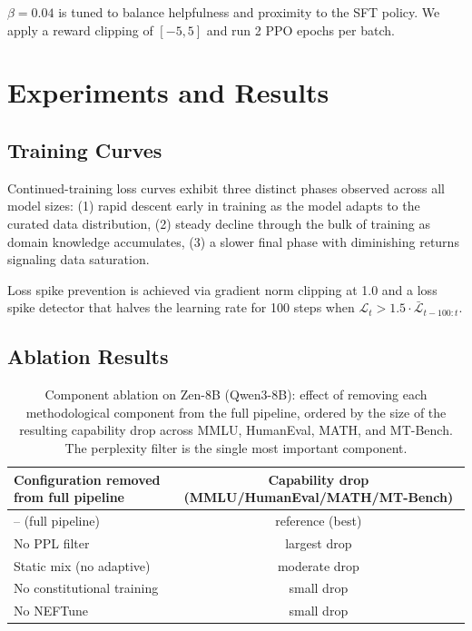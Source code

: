 \documentclass[11pt,a4paper]{article}
\begin{document}
$\beta = 0.04$ is tuned to balance helpfulness and proximity to the SFT policy.
We apply a reward clipping of $[-5, 5]$ and run 2 PPO epochs per batch.

\section{Experiments and Results}

\subsection{Training Curves}

Continued-training loss curves exhibit three distinct phases observed across all model
sizes: (1) rapid descent early in training as the model adapts to the curated data
distribution, (2) steady decline through the bulk of training as domain knowledge
accumulates, (3) a slower final phase with diminishing returns signaling data saturation.

Loss spike prevention is achieved via gradient norm clipping at 1.0 and a loss
spike detector that halves the learning rate for 100 steps when $\mathcal{L}_t > 1.5 \cdot \bar{\mathcal{L}}_{t-100:t}$.

\subsection{Ablation Results}

\begin{table}[H]
\centering
\begin{tabular}{lc}
\toprule
\textbf{Configuration removed from full pipeline} & \textbf{Capability drop (MMLU/HumanEval/MATH/MT-Bench)} \\
\midrule
-- (full pipeline)         & reference (best) \\
No PPL filter              & largest drop \\
Static mix (no adaptive)   & moderate drop \\
No constitutional training & small drop \\
No NEFTune                 & small drop \\
\bottomrule
\end{tabular}
\caption{Component ablation on Zen-8B (Qwen3-8B): effect of removing each methodological
component from the full pipeline, ordered by the size of the resulting capability drop
across MMLU, HumanEval, MATH, and MT-Bench. The perplexity filter is the single most
important component.}
\end{table}
\end{document}
